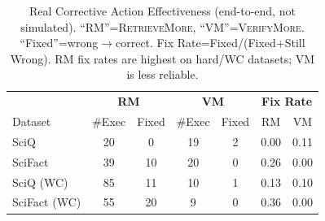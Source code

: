 \begin{table}[t]
\centering
\footnotesize
\setlength{\tabcolsep}{3pt}
\caption{Real Corrective Action Effectiveness (end-to-end, not simulated). ``RM''=\textsc{RetrieveMore}, ``VM''=\textsc{VerifyMore}. ``Fixed''=wrong$\to$correct. Fix Rate=Fixed/(Fixed+Still Wrong). RM fix rates are highest on hard/WC datasets; VM is less reliable.}
\label{tab:fix_rates}
\begin{tabular}{l|cc|cc|cc}
\toprule
& \multicolumn{2}{c|}{\textbf{RM}} & \multicolumn{2}{c|}{\textbf{VM}} & \multicolumn{2}{c}{\textbf{Fix Rate}} \\
Dataset & \#Exec & Fixed & \#Exec & Fixed & RM & VM \\
\midrule
SciQ & 20 & 0 & 19 & 2 & 0.00 & 0.11 \\
SciFact & 39 & 10 & 20 & 0 & 0.26 & 0.00 \\
SciQ (WC) & 85 & 11 & 10 & 1 & 0.13 & 0.10 \\
SciFact (WC) & 55 & 20 & 9 & 0 & 0.36 & 0.00 \\
\bottomrule
\end{tabular}
\end{table}
